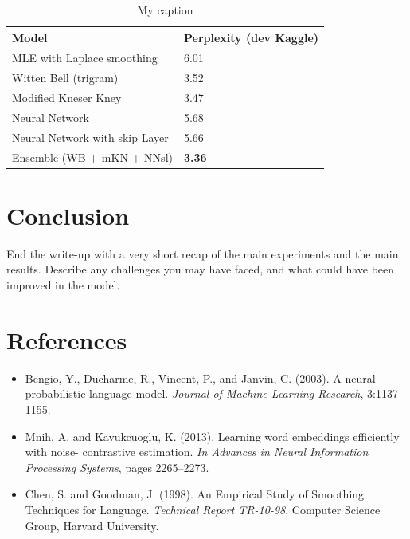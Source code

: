 \documentclass[11pt]{article}
\begin{document}
\begin{table}[]
\centering
\caption{My caption}
\label{my-label}
\begin{tabular}{|l|l|}
\hline
Model                          & Perplexity (dev Kaggle) \\ \hline
MLE with Laplace smoothing     & 6.01                    \\ \hline
Witten Bell (trigram)          & 3.52                    \\ \hline
Modified Kneser Kney           & 3.47                    \\ \hline
Neural Network                 & 5.68                    \\ \hline
Neural Network with skip Layer & 5.66                    \\ \hline
Ensemble (WB + mKN + NNsl)     & \textbf{3.36}                    \\ \hline
\end{tabular}
\end{table}


\section{Conclusion}

End the write-up with a very short recap of the main experiments and the main results. Describe any challenges you may have faced, and what could have been improved in the model.

\section{References}
\begin{itemize}
\item Bengio, Y., Ducharme, R., Vincent, P., and Janvin, C. (2003). A neural probabilistic language model. \emph{Journal of Machine Learning Research}, 3:1137–1155.

\item Mnih, A. and Kavukcuoglu, K. (2013). Learning word embeddings efficiently with noise- contrastive estimation. \emph{In Advances in Neural Information Processing Systems}, pages 2265–2273.

\item Chen, S. and Goodman, J. (1998). An Empirical Study of Smoothing Techniques for Language. \emph{Technical Report TR-10-98}, Computer Science Group, Harvard University.
\end{itemize}

\newpage

\begin{appendices}



\end{appendices}
\end{document}

